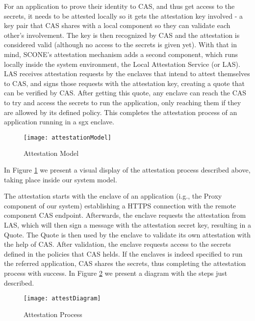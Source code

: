 For an application to prove their identity to CAS, and thus get access to the secrets, it needs to be attested locally so it gets the attestation key involved - a key pair that CAS shares with a local component so they can validate each other's involvement. The key is then recognized by CAS and the attestation is considered valid (although no access to the secrets is given yet). With that in mind, SCONE's attestation mechanism adds a second component, which runs locally inside the system environment, the Local Attestation Service (or LAS). LAS receives attestation requests by the enclaves that intend to attest themselves to CAS, and signs those requests with the attestation key, creating a quote that can be verified by CAS. After getting this quote, any enclave can reach the CAS to try and access the secrets to run the application, only reaching them if they are allowed by its defined policy. This completes the attestation process of an application running in a \gls{sgx} enclave. 
\vspace{3mm}

\begin{figure}[htbp]
	\centering
	{\texttt{[image: attestationModel]}}
	\caption{Attestation Model}
	\label{fig:attestationModel}
\end{figure}

In Figure \ref{fig:attestationModel} we present a visual display of the attestation process described above, taking place inside our system model.

The attestation starts with the enclave of an application (i.g., the Proxy component of our system) establishing a HTTPS connection with the remote component CAS endpoint. Afterwards, the enclave requests the attestation from LAS, which will then sign a message with the attestation secret key, resulting in a Quote. The Quote is then used by the enclave to validate its own attestation with the help of CAS. After validation, the enclave requests access to the secrets defined in the policies that CAS helds. If the enclaves is indeed specified to run the referred application, CAS shares the secrets, thus completing the attestation process with success. In Figure \ref{fig:attestationProcess} we present a diagram with the steps just described.

\begin{figure}[htbp]
	\centering
	{\texttt{[image: attestDiagram]}}
	\caption{Attestation Process}
	\label{fig:attestationProcess}
\end{figure}


